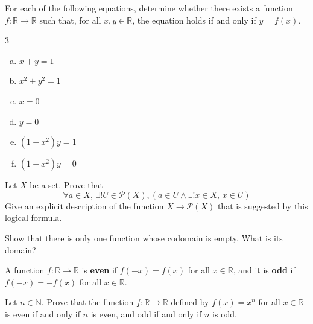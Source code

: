 \begin{chapex}
For each of the following equations, determine whether there exists a function $f : \mathbb{R} \to \mathbb{R}$ such that, for all $x,y \in \mathbb{R}$, the equation holds if and only if $y=f(x)$.
\begin{multicols}{3}
\begin{enumerate}[(a)]
\item $x+y=1$
\item $x^2+y^2=1$
\item $x=0$
\item $y=0$
\item $(1+x^2)y=1$
\item $(1-x^2)y=0$
\end{enumerate}
\end{multicols}
\end{chapex}

\begin{chapex}
\label{cqSingletonSubsetFunction}
Let $X$ be a set. Prove that
\[ \forall a \in X,\, \exists ! U \in \mathcal{P}(X), (a \in U \wedge \exists ! x \in X,\, x \in U) \]
Give an explicit description of the function $X \to \mathcal{P}(X)$ that is suggested by this logical formula.
\end{chapex}

\begin{chapex}
\label{cqFunctionEmptyCodomain}
Show that there is only one function whose codomain is empty. What is its domain?
\end{chapex}

\begin{definition}
\label{defEvenOddFunction}
A function $f : \mathbb{R} \to \mathbb{R}$ is \textbf{even} if $f(-x)=f(x)$ for all $x \in \mathbb{R}$, and it is \textbf{odd} if $f(-x)=-f(x)$ for all $x \in \mathbb{R}$.
\end{definition}

\begin{chapex}
Let $n \in \mathbb{N}$. Prove that the function $f : \mathbb{R} \to \mathbb{R}$ defined by $f(x)=x^n$ for all $x \in \mathbb{R}$ is even if and only if $n$ is even, and odd if and only if $n$ is odd.
\end{chapex}

